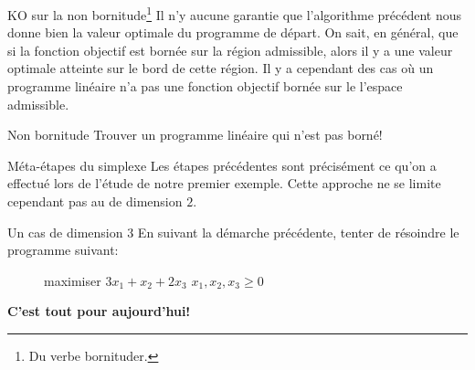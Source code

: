 \documentclass[aspectratio = 169]{beamer}
\begin{document}
\begin{frame}{KO sur la non bornitude\footnote{Du verbe bornituder.}}
  Il n'y aucune garantie que l'algorithme précédent nous donne bien la
  valeur optimale du programme de départ. On sait, en général, que si
  la fonction objectif est bornée sur la région admissible, alors il y
  a une valeur optimale atteinte sur le bord de cette région. Il y a
  cependant des cas où un programme linéaire n'a pas une fonction
  objectif bornée sur le l'espace admissible.
  \begin{halfshyblock}{Non bornitude}
    Trouver un programme linéaire qui n'est pas borné!
  \end{halfshyblock}
\end{frame}

\begin{frame}{Méta-étapes du simplexe}
  Les étapes précédentes sont précisément ce qu'on a effectué lors de
  l'étude de notre premier exemple. Cette approche ne se limite
  cependant pas au de dimension $2$.
  \begin{halfshyblock}{Un cas de dimension $3$}
    En suivant la démarche précédente, tenter de résoindre le
    programme suivant:
    \begin{figure}
      \begin{linearProg}{
          maximiser
        }{
          $3x_1 + x_2 + 2x_3 $
        }{
        }{
          $x_1, x_2, x_3 \geq 0 $
        }
      \end{linearProg}
    \end{figure}
  \end{halfshyblock}
\end{frame}

\begin{frame}
  \begin{center}
    {\huge \textbf{C'est tout pour aujourd'hui!}}
  \end{center}
\end{frame}



\end{document}

